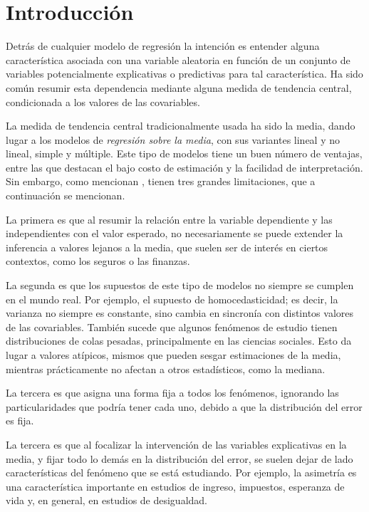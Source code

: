 \chapter{Introducci\'on}

Detr\'as de cualquier modelo de regresi\'on la intenci\'on es entender alguna caracter\'istica asociada con una variable aleatoria en funci\'on de un conjunto de variables potencialmente explicativas o predictivas para tal caracter\'istica. Ha sido com\'un resumir esta dependencia mediante alguna medida de tendencia central, condicionada a los valores de las covariables.

La medida de tendencia central tradicionalmente usada ha sido la media, dando lugar a los modelos de \textit{regresi\'on sobre la media}, con sus variantes lineal y no lineal, simple y m\'ultiple. Este tipo de modelos tiene un buen n\'umero de ventajas, entre las que destacan el bajo costo de estimaci\'on y la facilidad de interpretaci\'on. Sin embargo, como mencionan \cite{Hao_FrecQuantReg}, tienen tres grandes limitaciones, que a continuaci\'on se mencionan.

La primera es que al resumir la relaci\'on entre la variable dependiente y las independientes con el valor esperado, no necesariamente se puede extender la inferencia a valores lejanos a la media, que suelen ser de inter\'es en ciertos contextos, como los seguros o las finanzas.

La segunda es que los supuestos de este tipo de modelos no siempre se cumplen en el mundo real. Por ejemplo, el supuesto de homocedasticidad; es decir, la varianza no siempre es constante, sino cambia en sincron\'ia con distintos valores de las covariables. Tambi\'en sucede que algunos fen\'omenos de estudio tienen distribuciones de colas pesadas, principalmente en las ciencias sociales. Esto da lugar a valores at\'ipicos, mismos que pueden sesgar estimaciones de la media, mientras prácticamente no afectan a otros estadísticos, como la mediana.

La tercera es que asigna una forma fija a todos los fen\'omenos, ignorando las particularidades que podr\'ia tener cada uno, debido a que la distribuci\'on del error es fija. 

La tercera es que al focalizar la intervenci\'on de las variables explicativas en la media, y fijar todo lo demás en la distribución del error, se suelen dejar de lado caracter\'isticas del fen\'omeno que se est\'a estudiando. Por ejemplo, la asimetr\'ia es una caracter\'istica importante en estudios de ingreso, impuestos, esperanza de vida y, en general, en estudios de desigualdad.

